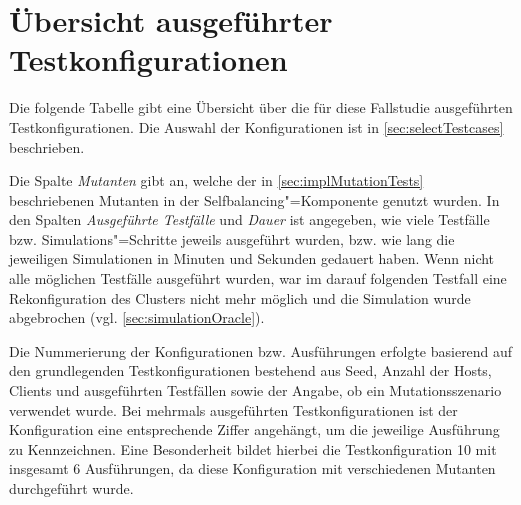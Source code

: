 \chapter{Übersicht ausgeführter Testkonfigurationen}
\label{app:overviewExecutedTestCases}

Die folgende Tabelle gibt eine Übersicht über die für diese Fallstudie ausgeführten Testkonfigurationen.
Die Auswahl der Konfigurationen ist in \autoref{sec:selectTestcases} beschrieben.

Die Spalte \emph{Mutanten} gibt an, welche der in \autoref{sec:implMutationTests} beschriebenen Mutanten in der Selfbalancing"=Komponente genutzt wurden.
In den Spalten \emph{Ausgeführte Testfälle} und \emph{Dauer} ist angegeben, wie viele Testfälle bzw. Simulations"=Schritte jeweils ausgeführt wurden, bzw. wie lang die jeweiligen Simulationen in Minuten und Sekunden gedauert haben.
Wenn nicht alle möglichen Testfälle ausgeführt wurden, war im darauf folgenden Testfall eine Rekonfiguration des Clusters nicht mehr möglich und die Simulation wurde abgebrochen (vgl. \autoref{sec:simulationOracle}).

Die Nummerierung der Konfigurationen bzw. Ausführungen erfolgte basierend auf den grundlegenden Testkonfigurationen bestehend aus Seed, Anzahl der Hosts, Clients und ausgeführten Testfällen sowie der Angabe, ob ein Mutationsszenario verwendet wurde.
Bei mehrmals ausgeführten Testkonfigurationen ist der Konfiguration eine entsprechende Ziffer angehängt, um die jeweilige Ausführung zu Kennzeichnen.
Eine Besonderheit bildet hierbei die Testkonfiguration 10 mit insgesamt 6 Ausführungen, da diese Konfiguration mit verschiedenen Mutanten durchgeführt wurde.

